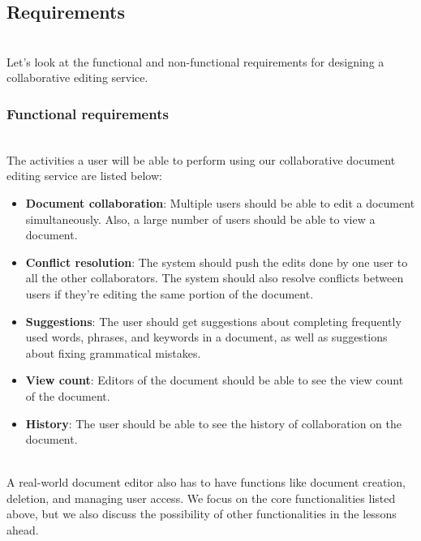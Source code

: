 

\subsection{Requirements}\label{xqks_xrwRYi0hYpxyZhv3}
\\
Let's look at the functional and non-functional requirements for designing a collaborative editing service.

\subsubsection{Functional requirements}\label{FSRVjcB-5F6tyekN3ABns}
\\
The activities a user will be able to perform using our collaborative document editing service are listed below:

\begin{itemize}
\item
\protect{}\label{yUg4xPANuvFmXZDN1KP7b}
\textbf{Document collaboration}: Multiple users should be able to edit a document simultaneously. Also, a large number of users should be able to view a document.
\item
\protect{}\label{d3fSuLo42OiSgmclGUqms}
\textbf{Conflict resolution}: The system should push the edits done by one user to all the other collaborators. The system should also resolve conflicts between users if they're editing the same portion of the document.
\item
\protect{}\label{LxJMo5R5Nyu16ne3dtRyU}
\textbf{Suggestions}: The user should get suggestions about completing frequently used words, phrases, and keywords in a document, as well as suggestions about fixing grammatical mistakes.
\item
\protect{}\label{uykosgcWlpwjF1yUY2CNu}
\textbf{View count}: Editors of the document should be able to see the view count of the document.
\item
\protect{}\label{M6jMnNplPVEMLAtt6tTto}
\textbf{History}: The user should be able to see the history of collaboration on the document.
\end{itemize}
\\
A real-world document editor also has to have functions like document creation, deletion, and managing user access. We focus on the core functionalities listed above, but we also discuss the possibility of other functionalities in the lessons ahead.

